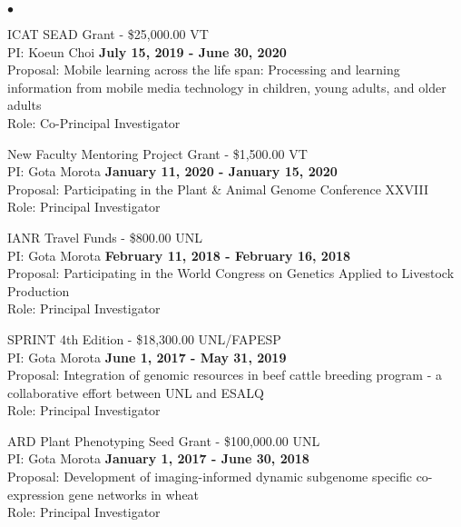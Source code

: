 \documentclass[margin,line,10pt]{res}
\newenvironment{list2}{
  \begin{list}{$\bullet$}{%
      \setlength{\itemsep}{0in}
      \setlength{\parsep}{0in} \setlength{\parskip}{0in}
      \setlength{\topsep}{0in} \setlength{\partopsep}{0in} 
      \setlength{\leftmargin}{0.2in}}}{\end{list}}
\begin{document}
\begin{resume}
\begin{list2}
\vspace{0.5cm}



\item ICAT SEAD Grant - \$25,000.00  \hfill VT\\
PI: Koeun Choi  \hfill \textbf{July 15, 2019 - June 30, 2020}\\
Proposal:  Mobile learning across the life span: Processing and learning information from mobile media technology in children, young adults, and older adults \\
Role: Co-Principal Investigator \\


\vspace{0.5cm}

\item New Faculty Mentoring Project Grant  - \$1,500.00  \hfill VT\\
PI: Gota Morota   \hfill \textbf{January 11, 2020 - January 15, 2020}\\
Proposal: Participating in the Plant \& Animal Genome Conference XXVIII\\
Role: Principal Investigator \\


\vspace{0.5cm}

\item IANR Travel Funds  - \$800.00  \hfill UNL\\
PI: Gota Morota   \hfill \textbf{February 11, 2018 - February 16, 2018}\\
Proposal: Participating in the World Congress on Genetics Applied to Livestock Production  \\
Role: Principal Investigator \\


\vspace{0.5cm}

\item SPRINT 4th Edition  - \$18,300.00  \hfill UNL/FAPESP\\
PI: Gota Morota   \hfill \textbf{June 1, 2017 - May 31, 2019}\\
Proposal: Integration of genomic resources in beef cattle breeding program - a collaborative effort between UNL and ESALQ  \\
Role: Principal Investigator \\


\vspace{0.5cm}
  
\item ARD Plant Phenotyping Seed Grant  - \$100,000.00  \hfill UNL\\
PI: Gota Morota   \hfill \textbf{January 1, 2017 - June 30, 2018}\\
Proposal: Development of imaging-informed dynamic subgenome specific co-expression gene networks in wheat  \\
Role: Principal Investigator \\


\end{list2}
\end{resume}
\end{document}
